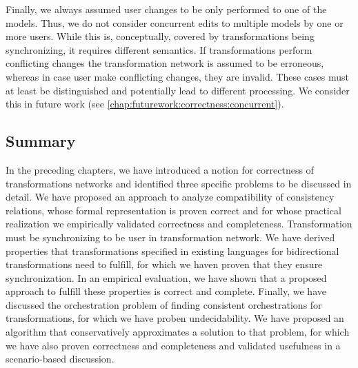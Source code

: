 Finally, we always assumed user changes to be only performed to one of the models.
Thus, we do not consider concurrent edits to multiple models by one or more users.
While this is, conceptually, covered by transformations being synchronizing, it requires different semantics.
If transformations perform conflicting changes the transformation network is assumed to be erroneous, whereas in case user make conflicting changes, they are invalid.
These cases must at least be distinguished and potentially lead to different processing.
We consider this in future work (see \autoref{chap:futurework:correctness:concurrent}).







\subsection{Summary}

In the preceding chapters, we have introduced a notion for correctness of transformations networks and identified three specific problems to be discussed in detail.
We have proposed an approach to analyze compatibility of consistency relations, whose formal representation is proven correct and for whose practical realization we empirically validated correctness and completeness.
Transformation must be synchronizing to be user in transformation network.
We have derived properties that transformations specified in existing languages for bidirectional transformations need to fulfill, for which we haven proven that they ensure synchronization.
In an empirical evaluation, we have shown that a proposed approach to fulfill these properties is correct and complete.
Finally, we have discussed the orchestration problem of finding consistent orchestrations for transformations, for which we have proben undecidability.
We have proposed an algorithm that conservatively approximates a solution to that problem, for which we have also proven correctness and completeness and validated usefulness in a scenario-based discussion.


